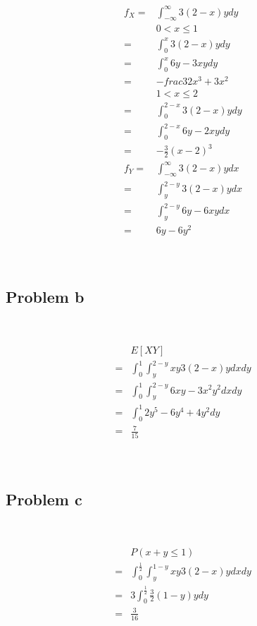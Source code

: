 \documentclass{article}
\begin{document}
\begin{equation*}
    \begin{split}
        f_X=&\int_{-\infty}^{\infty}3(2-x)ydy\\
        &0<x\leqslant1\\
        =&\int_{0}^{x}3(2-x)ydy\\
        =&\int_{0}^{x}6y-3xydy\\
        =&-frac{3}{2}x^3+3x^2\\
        &1<x\leqslant2\\
        =&\int_{0}^{2-x}3(2-x)ydy\\
        =&\int_{0}^{2-x}6y-2xydy\\
        =&-\frac{3}{2}(x-2)^3\\
        f_Y=&\int_{-\infty}^{\infty}3(2-x)ydx\\
        =&\int_{y}^{2-y}3(2-x)ydx\\
        =&\int_{y}^{2-y}6y-6xydx\\
        =&6y-6y^2\\
    \end{split}
\end{equation*}

~

\subsection*{Problem b}

~

\begin{equation*}
    \begin{split}
        &E[XY]\\
        =&\int_{0}^{1}\int_{y}^{2-y}xy3(2-x)ydxdy\\
        =&\int_{0}^{1}\int_{y}^{2-y}6xy-3x^2y^2dxdy\\
        =&\int_{0}^{1}2y^5-6y^4+4y^2dy\\
        =&\frac{7}{15}\\
    \end{split}
\end{equation*}

~

\subsection*{Problem c}

~

\begin{equation*}
    \begin{split}
        &P(x+y\leqslant1)\\
        =&\int_{0}^{\frac{1}{2}}\int_{y}^{1-y}xy3(2-x)ydxdy\\
        =&3\int_{0}^{\frac{1}{2}}\frac{3}{2}(1-y)ydy\\
        =&\frac{3}{16}\\
    \end{split}
\end{equation*}
\end{document}
